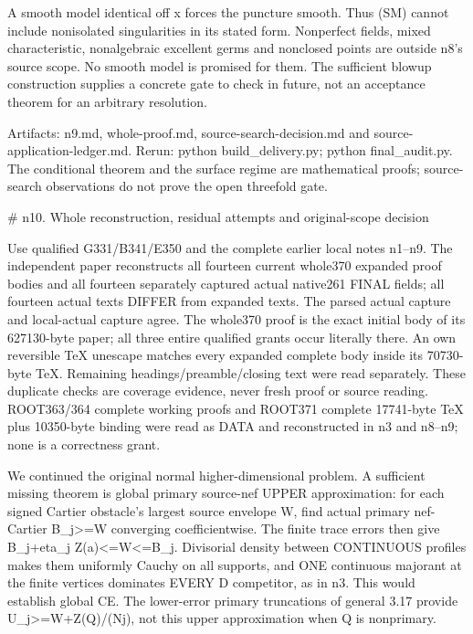 \documentclass[11pt]{article}
\begin{document}
A smooth model identical off x forces the puncture smooth. Thus (SM) cannot include nonisolated singularities in its stated form. Nonperfect fields, mixed characteristic, nonalgebraic excellent germs and nonclosed points are outside n8's source scope. No smooth model is promised for them. The sufficient blowup construction supplies a concrete gate to check in future, not an acceptance theorem for an arbitrary resolution.

Artifacts: n9.md, whole-proof.md, source-search-decision.md and source-application-ledger.md. Rerun: python build\_delivery.py; python final\_audit.py. The conditional theorem and the surface regime are mathematical proofs; source-search observations do not prove the open threefold gate.

 \# n10. Whole reconstruction, residual attempts and original-scope decision

Use qualified G331/B341/E350 and the complete earlier local notes n1--n9. The independent paper reconstructs all fourteen current whole370 expanded proof bodies and all fourteen separately captured actual native261 FINAL fields; all fourteen actual texts DIFFER from expanded texts. The parsed actual capture and local-actual capture agree. The whole370 proof is the exact initial body of its 627130-byte paper; all three entire qualified grants occur literally there. An own reversible TeX unescape matches every expanded complete body inside its 70730-byte TeX. Remaining headings/preamble/closing text were read separately. These duplicate checks are coverage evidence, never fresh proof or source reading. ROOT363/364 complete working proofs and ROOT371 complete 17741-byte TeX plus 10350-byte binding were read as DATA and reconstructed in n3 and n8--n9; none is a correctness grant.

We continued the original normal higher-dimensional problem. A sufficient missing theorem is global primary source-nef UPPER approximation: for each signed Cartier obstacle's largest source envelope W, find actual primary nef-Cartier B\_j>=W converging coefficientwise. The finite trace errors then give B\_j+eta\_j Z(a)<=W<=B\_j. Divisorial density between CONTINUOUS profiles makes them uniformly Cauchy on all supports, and ONE continuous majorant at the finite vertices dominates EVERY D competitor, as in n3. This would establish global CE. The lower-error primary truncations of general 3.17 provide U\_j>=W+Z(Q)/(Nj), not this upper approximation when Q is nonprimary.
\end{document}
